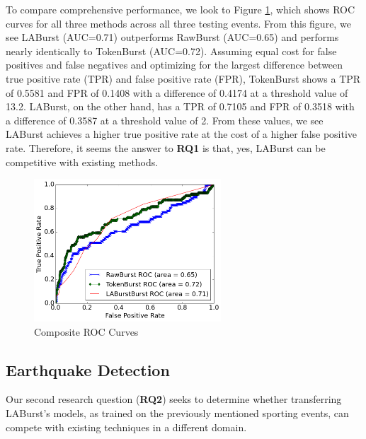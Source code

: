 \documentclass[letterpaper]{article}
\begin{document}
To compare comprehensive performance, we look to Figure \ref{fig:rocComprehensive}, which shows ROC curves for all three methods across all three testing events.
From this figure, we see LABurst (AUC=0.71) outperforms RawBurst (AUC=0.65) and performs nearly identically to TokenBurst (AUC=0.72).
Assuming equal cost for false positives and false negatives and optimizing for the largest difference between true positive rate (TPR) and false positive rate (FPR), TokenBurst shows a TPR of 0.5581 and FPR of 0.1408 with a difference of 0.4174 at a threshold value of 13.2.
LABurst, on the other hand, has a TPR of 0.7105 and FPR of 0.3518 with a difference of 0.3587 at a threshold value of 2.
From these values, we see LABurst achieves a higher true positive rate at the cost of a higher false positive rate.
Therefore, it seems the answer to \textbf{RQ1} is that, yes, LABurst can be competitive with existing methods.

\begin{figure}[hbtp]
\begin{center}
\includegraphics[width=2.75in]{./figures/roc_Comp.png}
\caption{Composite ROC Curves}
\label{fig:rocComprehensive}
\end{center}
\end{figure}

\subsection{Earthquake Detection}

Our second research question (\textbf{RQ2}) seeks to determine whether transferring LABurst's models, as trained on the previously mentioned sporting events, can compete with existing techniques in a different domain.
\end{document}
